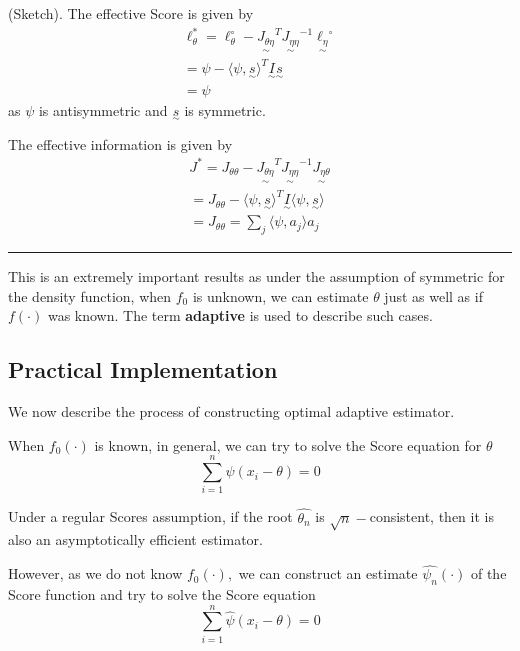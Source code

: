 \documentclass[twoside]{article}
\newenvironment{proof}{{\bf Proof:}}{\hfill\rule{2mm}{2mm}}
\newcommand{\utilde}{\underset{\sim}}
\begin{document}
\begin{proof}(Sketch). The effective Score is given by 
\begin{align}
\ell_{\theta}^{*} = \ell_{\theta}^{\circ} - \utilde{J_{\theta \eta}}^T\utilde{J_{\eta \eta}}^{-1}\utilde{\ell_{\eta}}^{\circ}
\\ = \psi - \langle \psi, \utilde{s} \rangle^T \utilde{I} \utilde{s}
\\ = \psi
\end{align}
as $\psi$ is antisymmetric and $\utilde{s}$ is symmetric.

The effective information is given by 
\begin{align}
J^{*} = J_{\theta \theta} - \utilde{J_{\theta \eta}}^T\utilde{J_{\eta \eta}}^{-1}\utilde{J_{\eta \theta}}
\\ = J_{\theta \theta} - \langle \psi, \utilde{s} \rangle^T \utilde{I}\langle \psi, \utilde{s} \rangle
\\ = J_{\theta \theta} = \sum_j \langle \psi, a_j\rangle a_j
\end{align}
\end{proof}

This is an extremely important results as under the assumption of symmetric for the density function, when $f_0$ is unknown, we can estimate $\theta$ just as well as if $f(\cdot)$ was known. The term \textbf{adaptive} is used to describe such cases.

\subsection{Practical Implementation}

We now describe the process of constructing optimal adaptive estimator.

When $f_0(\cdot)$ is known, in general, we can try to solve the Score equation for $\theta$
\begin{equation}
  \sum_{i=1}^{n}\psi(x_i - \theta) = 0
\end{equation}

Under a regular Scores assumption, if the root $\hat{\theta_{n}}$ is $\sqrt{n}-$consistent, then it is also an asymptotically efficient estimator.

However, as we do not know $f_0(\cdot),$ we can construct an estimate $\hat{\psi_{n}}(\cdot)$ of the Score function and try to solve the Score equation
\begin{equation}
  \sum_{i=1}^{n}\hat{\psi}(x_i - \theta) = 0
\end{equation}
\end{document}
